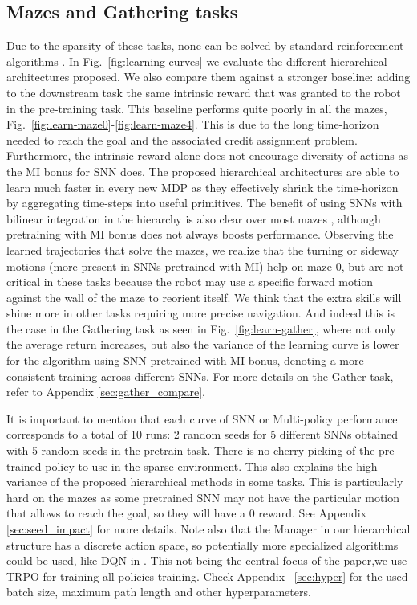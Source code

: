 \documentclass{article} %
\begin{document}
\subsection{Mazes and Gathering tasks}
Due to the sparsity of these tasks, none can be solved by standard reinforcement algorithms \citep{duan2016benchmarking}. In Fig.\ \ref{fig:learning-curves} we evaluate the different hierarchical architectures proposed. We also compare them against a stronger baseline: adding to the downstream task the same intrinsic reward that was granted to the robot in the pre-training task. This baseline performs quite poorly in all the mazes, Fig.\ \ref{fig:learn-maze0}-\ref{fig:learn-maze4}. This is due to the long time-horizon needed to reach the goal and the associated credit assignment problem. Furthermore, the intrinsic reward alone does not encourage diversity of actions as the MI bonus for SNN does. 
 The proposed hierarchical architectures are able to learn much faster in every new MDP as they effectively shrink the time-horizon by aggregating time-steps into useful primitives. The benefit of using SNNs with bilinear integration in the hierarchy is also clear over most mazes , although pretraining with MI bonus does not always boosts performance. Observing the learned trajectories that solve the mazes, we realize that the turning or sideway motions (more present in SNNs pretrained with MI) help on maze 0, but are not critical in these tasks because the robot may use a specific forward motion against the wall of the maze to reorient itself. We think that the extra skills will shine more in other tasks requiring more precise navigation. And indeed this is the case in the Gathering task as seen in Fig.\ \ref{fig:learn-gather}, where not only the average return increases, but also the variance of the learning curve is lower for the algorithm using SNN pretrained with MI bonus, denoting a more consistent training across different SNNs. For more details on the Gather task, refer to Appendix \ref{sec:gather_compare}.

It is important to mention that each curve of SNN or Multi-policy performance corresponds to a total of 10 runs: 2 random seeds for 5 different SNNs obtained with 5 random seeds in the pretrain task. There is no cherry picking of the pre-trained policy to use in the sparse environment. This also explains the high variance of the proposed hierarchical methods in some tasks. This is particularly hard on the mazes as some pretrained SNN may not have the particular motion that allows to reach the goal, so they will have a 0 reward. See Appendix \ref{sec:seed_impact} for more details.
Note also that the Manager in our hierarchical structure has a discrete action space, so potentially more specialized algorithms could be used, like DQN in \citet{mnih2015human}. This not being the central focus of the paper,we use TRPO for training all policies training. Check Appendix \ \ref{sec:hyper} for the used batch size, maximum path length and other hyperparameters. 
\end{document}
